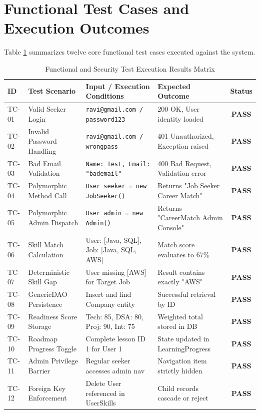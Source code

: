\documentclass[11pt,a4paper]{report}
\begin{document}
\section{Functional Test Cases and Execution Outcomes}
Table \ref{tab:test_matrix} summarizes twelve core functional test cases executed against the system.

\begin{table}[H]
    \centering
    \caption{Functional and Security Test Execution Results Matrix}
    \label{tab:test_matrix}
    \scriptsize
    \begin{tabular}{p{1.0cm}p{3.5cm}p{4.0cm}p{3.8cm}c}
        \toprule
        \textbf{ID} & \textbf{Test Scenario} & \textbf{Input / Execution Conditions} & \textbf{Expected Outcome} & \textbf{Status} \\
        \midrule
        TC-01 & Valid Seeker Login & \texttt{ravi@gmail.com / password123} & 200 OK, User identity loaded & \textbf{PASS} \\
        TC-02 & Invalid Password Handling & \texttt{ravi@gmail.com / wrongpass} & 401 Unauthorized, Exception raised & \textbf{PASS} \\
        TC-03 & Bad Email Validation & \texttt{Name: Test, Email: "bademail"} & 400 Bad Request, Validation error & \textbf{PASS} \\
        TC-04 & Polymorphic Method Call & \texttt{User seeker = new JobSeeker()} & Returns "Job Seeker Career Match" & \textbf{PASS} \\
        TC-05 & Polymorphic Admin Dispatch & \texttt{User admin = new Admin()} & Returns "CareerMatch Admin Console" & \textbf{PASS} \\
        TC-06 & Skill Match Calculation & User: [Java, SQL], Job: [Java, SQL, AWS] & Match score evaluates to 67\% & \textbf{PASS} \\
        TC-07 & Deterministic Skill Gap & User missing [AWS] for Target Job & Result contains exactly "AWS" & \textbf{PASS} \\
        TC-08 & GenericDAO Persistence & Insert and find Company entity & Successful retrieval by ID & \textbf{PASS} \\
        TC-09 & Readiness Score Storage & Tech: 85, DSA: 80, Proj: 90, Int: 75 & Weighted total stored in DB & \textbf{PASS} \\
        TC-10 & Roadmap Progress Toggle & Complete lesson ID 1 for User 1 & State updated in LearningProgress & \textbf{PASS} \\
        TC-11 & Admin Privilege Barrier & Regular seeker accesses admin nav & Navigation item strictly hidden & \textbf{PASS} \\
        TC-12 & Foreign Key Enforcement & Delete User referenced in UserSkills & Child records cascade or reject & \textbf{PASS} \\
        \bottomrule
    \end{tabular}
\end{table}
\end{document}
